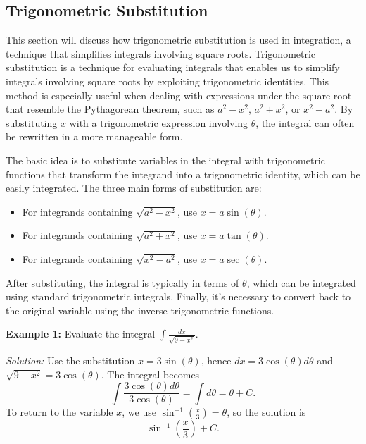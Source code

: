 \documentclass[a4paper,12pt]{book}
\begin{document}

\subsection{Trigonometric Substitution}
\label{subsec:trig_substitution}
This section will discuss how trigonometric substitution is used in integration, a technique that simplifies integrals involving square roots.
Trigonometric substitution is a technique for evaluating integrals that enables us to simplify integrals involving square roots by exploiting trigonometric identities. This method is especially useful when dealing with expressions under the square root that resemble the Pythagorean theorem, such as \( a^2 - x^2 \), \( a^2 + x^2 \), or \( x^2 - a^2 \). By substituting \( x \) with a trigonometric expression involving \( \theta \), the integral can often be rewritten in a more manageable form.

The basic idea is to substitute variables in the integral with trigonometric functions that transform the integrand into a trigonometric identity, which can be easily integrated. The three main forms of substitution are:
\begin{itemize}
    \item For integrands containing \( \sqrt{a^2 - x^2} \), use \( x = a \sin(\theta) \).
    \item For integrands containing \( \sqrt{a^2 + x^2} \), use \( x = a \tan(\theta) \).
    \item For integrands containing \( \sqrt{x^2 - a^2} \), use \( x = a \sec(\theta) \).
\end{itemize}

After substituting, the integral is typically in terms of \( \theta \), which can be integrated using standard trigonometric integrals. Finally, it's necessary to convert back to the original variable using the inverse trigonometric functions.

\textbf{Example 1:}
Evaluate the integral \( \int \frac{dx}{\sqrt{9 - x^2}} \).

\textit{Solution:} Use the substitution \( x = 3\sin(\theta) \), hence \( dx = 3\cos(\theta)d\theta \) and \( \sqrt{9 - x^2} = 3\cos(\theta) \). The integral becomes
\[ \int \frac{3\cos(\theta)d\theta}{3\cos(\theta)} = \int d\theta = \theta + C. \]
To return to the variable \( x \), we use \( \sin^{-1}(\frac{x}{3}) = \theta \), so the solution is
\[ \sin^{-1}\left(\frac{x}{3}\right) + C. \]
\end{document}
